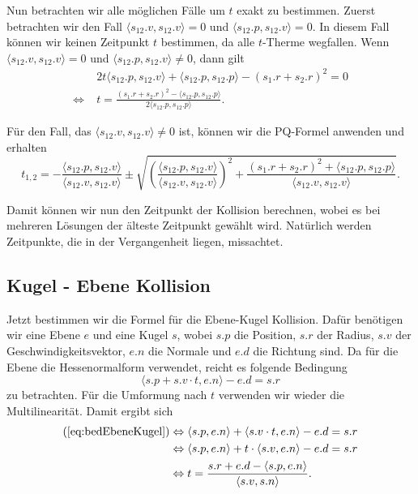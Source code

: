 \documentclass[a4paper, 10pt, openright, parskip, chapterprefix]{scrreprt}
\begin{document}
\noindent Nun betrachten wir alle möglichen Fälle um $t$ exakt zu bestimmen. Zuerst betrachten wir den Fall $\langle s_{12}.v, s_{12}.v \rangle = 0$ und $\langle s_{12}.p, s_{12}.v \rangle = 0$. In diesem Fall können wir keinen Zeitpunkt $t$ bestimmen, da alle $t$-Therme wegfallen. Wenn
$\langle s_{12}.v, s_{12}.v \rangle = 0$ und $\langle s_{12}.p, s_{12}.v\rangle \not= 0$, dann gilt
\begin{align*}
&2t \langle s_{12}.p, s_{12}.v\rangle + \langle s_{12}.p, s_{12}.p \rangle - (s_{1}.r + s_{2}.r)^{2} = 0 \\
\Leftrightarrow \; &t  = \frac{(s_{1}.r + s_{2}.r)^{2} - \langle s_{12}.p, s_{12}.p \rangle}{2 \langle s_{12}.p, s_{12}.p\rangle}\text{.}
\end{align*}

\noindent  Für den Fall, das $\langle s_{12}.v, s_{12}.v \rangle \not= 0$ ist, können wir die PQ-Formel anwenden und erhalten
\begin{equation*}
t_{1, 2} = -\frac{\langle s_{12}.p, s_{12}.v\rangle}{\langle s_{12}.v, s_{12}.v \rangle} \pm \sqrt{ \left( \frac{\langle s_{12}.p, s_{12}.v\rangle}{\langle s_{12}.v, s_{12}.v \rangle} \right)^{2} + \frac{(s_{1}.r + s_{2}.r)^{2} + \langle s_{12}.p, s_{12}.p\rangle}{\langle s_{12}.v, s_{12}.v \rangle}}\text{.}
\end{equation*}

\noindent Damit können wir nun den Zeitpunkt der Kollision berechnen, wobei es bei mehreren Lösungen der älteste Zeitpunkt gewählt wird. Natürlich werden Zeitpunkte, die in der Vergangenheit liegen, missachtet. 

\subsection{Kugel - Ebene Kollision}
Jetzt bestimmen wir die Formel für die Ebene-Kugel Kollision. Dafür benötigen wir eine Ebene $e$ und eine Kugel $s$, wobei $s.p$ die Position, $s.r$ der Radius, $s.v$ der Geschwindigkeitsvektor, $e.n$ die Normale und $e.d$ die Richtung sind.  Da für die Ebene die Hessenormalform verwendet, reicht es folgende Bedingung 
\begin{equation}
	\langle s.p + s.v  \cdot t, e.n \rangle - e.d = s.r
	\label{eq:bedEbeneKugel}
\end{equation}
zu betrachten. Für die Umformung nach $t$ verwenden wir wieder die Multilinearität. Damit ergibt sich
\begin{align*}
(\ref{eq:bedEbeneKugel}) &\Leftrightarrow \langle s.p, e.n \rangle + \langle s.v \cdot t, e.n \rangle - e.d = s.r \\
&\Leftrightarrow \langle s.p, e.n \rangle + t \cdot \langle s.v, e.n\rangle - e.d = s.r\\
&\Leftrightarrow t = \frac{s.r + e.d - \langle s.p, e.n \rangle}{ \langle s.v, s.n \rangle}\text{.}
\end{align*}
\end{document}
